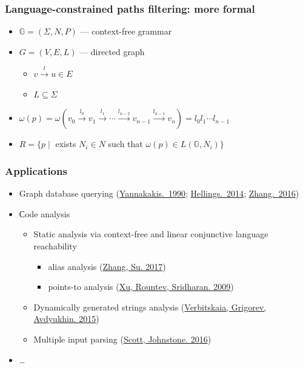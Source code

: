 \documentclass{beamer}
\begin{document}
\begin{frame}[fragile]
  \transwipe[direction=90]
  \frametitle{Language-constrained paths filtering: more formal}
  \begin{itemize}
    \item $\mathbb{G} = (\Sigma, N, P)$ --- context-free grammar
    \item $G = (V,E,L)$ --- directed graph
      \begin{itemize} 
        \item $v \xrightarrow{l} u \in E$
        \item $L\subseteq \Sigma$
      \end{itemize}
    \item $\omega(p) = \omega(v_0 \xrightarrow{l_0} v_1 \xrightarrow{l_1} \cdots \xrightarrow{l_{n-2}} v_{n-1} \xrightarrow{l_{n-1}} v_n) = l_0 l_1 \cdots l_{n-1}$
    \item $R = \{ p \mid $ exists $ N_i \in N $ such that $ \omega(p) \in L(\mathbb{G},N_i)\}$
  \end{itemize}
\end{frame}

\begin{frame}[fragile]
  \transwipe[direction=90]
  \frametitle{Applications}
  \begin{itemize}
    \item Graph database querying (\href{http://dl.acm.org/citation.cfm?id=298576}{Yannakakis.~1990}; \href{https://uhdspace.uhasselt.be/dspace/handle/1942/16709}{Hellings.~2014}; \href{https://link.springer.com/chapter/10.1007/978-3-319-46523-4_38}{Zhang.~2016})
    \item Сode analysis
    \begin{itemize}
      \item Static analysis via context-free and linear conjunctive language reachability
        \begin{itemize}
          \item alias analysis (\href{https://dl.acm.org/citation.cfm?id=3009848}{Zhang, Su. 2017})
          \item points-to analysis (\href{https://link.springer.com/chapter/10.1007/978-3-642-03013-0_6}{Xu, Rountev, Sridharan. 2009})
        \end{itemize}
      \item Dynamically generated strings analysis (\href{https://link.springer.com/chapter/10.1007/978-3-319-41579-6\_22}{Verbitskaia, Grigorev, Avdyukhin. 2015})
      \item Multiple input parsing (\href{https://2016.splashcon.org/event/parsing2016-multiple-input-gll-parsing}{Scott, Johnstone. 2016})
    \end{itemize}
    \item \dots
  \end{itemize}
\end{frame}
\end{document}
